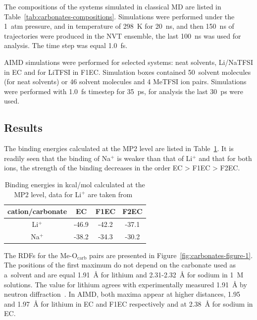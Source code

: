 The compositions of the systems simulated in classical MD are listed in Table~\ref{tab:carbonates-compositions}. Simulations were performed under the 1~atm pressure, and in temperature of 298~K for 20~ns, and then 150~ns of trajectories were produced in the NVT ensemble, the last 100~ns was used for analysis. The time step was equal 1.0~fs.

AIMD simulations were performed for selected systems: neat solvents, Li/NaTFSI in EC and for LiTFSI in F1EC. Simulation boxes contained 50~solvent molecules (for neat solvents) or 46 solvent molecules and 4 MeTFSI ion pairs. Simulations were performed with 1.0~fs timestep for 35~ps, for analysis the last 30~ps were used.

\subsection{Results}

The binding energies calculated at the MP2 level are listed in Table~\ref{tab:carbonates-binding-energies}. It is readily seen that the binding of Na$^{+}$ is weaker than that of Li$^{+}$ and that for both ions, the strength of the binding decreases in the order EC > F1EC > F2EC.

\begin{table}[ht]
  \centering
  \caption[Binding energies in kcal/mol calculated at the MP2 level]{Binding energies in kcal/mol calculated at the MP2 level, data for Li$^{+}$ are taken from~\cite{carbonates-li-binding-energies}}
  \label{tab:carbonates-binding-energies}
\begin{tabular}{cccc}
\toprule
cation/carbonate & EC    & F1EC  & F2EC  \\
\midrule
Li$^{+}$               & -46.9 & -42.2 & -37.1 \\
Na$^{+}$               & -38.2 & -34.3 & -30.2 \\
\bottomrule
\end{tabular}
\end{table}

The RDFs for the Me-O$_{\text{carb}}$ pairs are presented in Figure~\ref{fig:carbonates-figure-1}. The positions of the first maximum do not depend on the carbonate used as a~solvent and are equal 1.91~{\AA} for lithium and 2.31-2.32~{\AA} for sodium in 1~M solutions. The value for lithium agrees with experimentally measured 1.91~{\AA} by neutron diffraction~\cite{neutron-diffraction}. In AIMD, both maxima appear at higher distances, 1.95 and 1.97~{\AA} for lithium in EC and F1EC respectively and at 2.38~{\AA} for sodium in EC.

